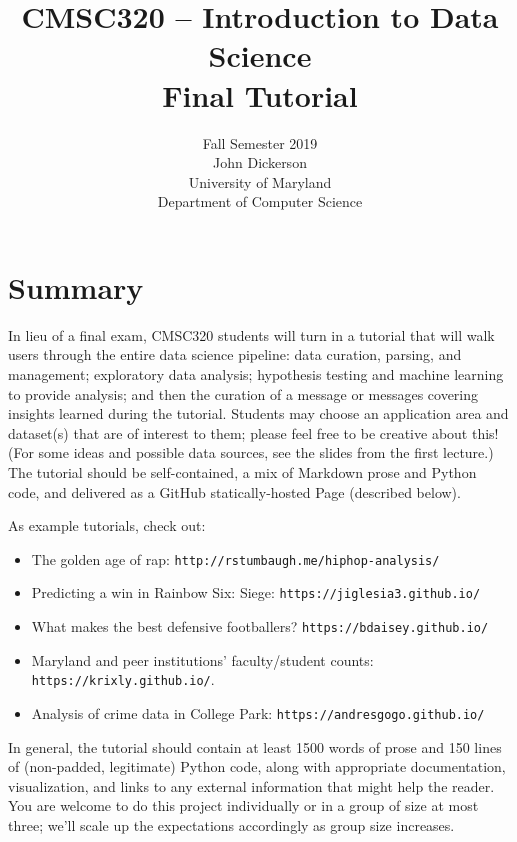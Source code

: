 \documentclass[11pt]{article}
\title{\vspace{-0.7in} CMSC320 -- Introduction to Data Science\\
\textbf{Final Tutorial}}
\author{Fall Semester 2019\\[.2in]
  John Dickerson\\
  University of Maryland\\
  Department of Computer Science}
\date{}
\begin{document}
\maketitle


\section{Summary}
In lieu of a final exam, CMSC320 students will turn in a tutorial that will walk users through the entire data science pipeline: data curation, parsing, and management; exploratory data analysis; hypothesis testing and machine learning to provide analysis; and then the curation of a message or messages covering insights learned during the tutorial.  Students may choose an application area and dataset(s) that are of interest to them; please feel free to be creative about this!  (For some ideas and possible data sources, see the slides from the first lecture.)  The tutorial should be self-contained, a mix of Markdown prose and Python code, and delivered as a GitHub statically-hosted Page (described below).

As example tutorials, check out:
\begin{itemize}
\item The golden age of rap: \texttt{http://rstumbaugh.me/hiphop-analysis/}
\item Predicting a win in Rainbow Six: Siege: \texttt{https://jiglesia3.github.io/}
\item What makes the best defensive footballers?  \texttt{https://bdaisey.github.io/}
\item Maryland and peer institutions' faculty/student counts: \texttt{https://krixly.github.io/}.
\item Analysis of crime data in College Park: \texttt{https://andresgogo.github.io/}
\end{itemize}
In general, the tutorial should contain at least 1500 words of prose and 150 lines of (non-padded, legitimate) Python code, along with appropriate documentation, visualization, and links to any external information that might help the reader.  You are welcome to do this project individually or in a group of size at most three; we'll scale up the expectations accordingly as group size increases.
\end{document}
